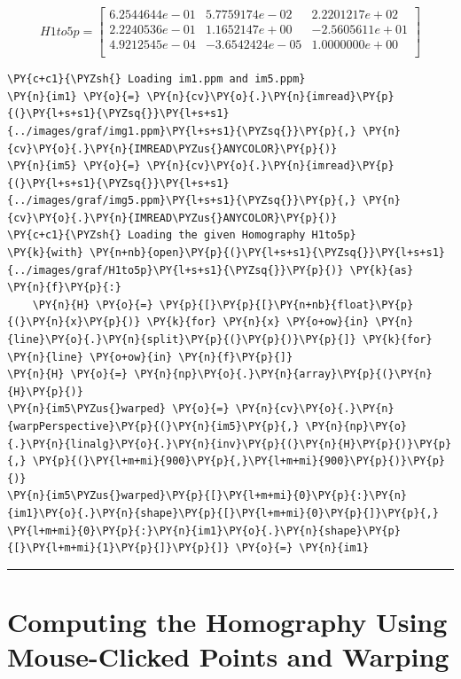 \documentclass[a4paper,11pt]{article}%
\begin{document}
{\scriptsize

\[
H1to5p = 
\begin{bmatrix}
   6.2544644e-01&   5.7759174e-02&   2.2201217e+02\\
2.2240536e-01   &1.1652147e+00  &-2.5605611e+01\\
4.9212545e-04 & -3.6542424e-05 &  1.0000000e+00\\
\end{bmatrix}
\]}
    \begin{tcolorbox}[breakable, size=fbox, boxrule=1pt, pad at break*=1mm,colback=cellbackground, colframe=cellborder]
\begin{Verbatim}[commandchars=\\\{\}]
\PY{c+c1}{\PYZsh{} Loading im1.ppm and im5.ppm}
\PY{n}{im1} \PY{o}{=} \PY{n}{cv}\PY{o}{.}\PY{n}{imread}\PY{p}{(}\PY{l+s+s1}{\PYZsq{}}\PY{l+s+s1}{../images/graf/img1.ppm}\PY{l+s+s1}{\PYZsq{}}\PY{p}{,} \PY{n}{cv}\PY{o}{.}\PY{n}{IMREAD\PYZus{}ANYCOLOR}\PY{p}{)}
\PY{n}{im5} \PY{o}{=} \PY{n}{cv}\PY{o}{.}\PY{n}{imread}\PY{p}{(}\PY{l+s+s1}{\PYZsq{}}\PY{l+s+s1}{../images/graf/img5.ppm}\PY{l+s+s1}{\PYZsq{}}\PY{p}{,} \PY{n}{cv}\PY{o}{.}\PY{n}{IMREAD\PYZus{}ANYCOLOR}\PY{p}{)}
\PY{c+c1}{\PYZsh{} Loading the given Homography H1to5p}
\PY{k}{with} \PY{n+nb}{open}\PY{p}{(}\PY{l+s+s1}{\PYZsq{}}\PY{l+s+s1}{../images/graf/H1to5p}\PY{l+s+s1}{\PYZsq{}}\PY{p}{)} \PY{k}{as} \PY{n}{f}\PY{p}{:}
    \PY{n}{H} \PY{o}{=} \PY{p}{[}\PY{p}{[}\PY{n+nb}{float}\PY{p}{(}\PY{n}{x}\PY{p}{)} \PY{k}{for} \PY{n}{x} \PY{o+ow}{in} \PY{n}{line}\PY{o}{.}\PY{n}{split}\PY{p}{(}\PY{p}{)}\PY{p}{]} \PY{k}{for} \PY{n}{line} \PY{o+ow}{in} \PY{n}{f}\PY{p}{]}
\PY{n}{H} \PY{o}{=} \PY{n}{np}\PY{o}{.}\PY{n}{array}\PY{p}{(}\PY{n}{H}\PY{p}{)}
\PY{n}{im5\PYZus{}warped} \PY{o}{=} \PY{n}{cv}\PY{o}{.}\PY{n}{warpPerspective}\PY{p}{(}\PY{n}{im5}\PY{p}{,} \PY{n}{np}\PY{o}{.}\PY{n}{linalg}\PY{o}{.}\PY{n}{inv}\PY{p}{(}\PY{n}{H}\PY{p}{)}\PY{p}{,} \PY{p}{(}\PY{l+m+mi}{900}\PY{p}{,}\PY{l+m+mi}{900}\PY{p}{)}\PY{p}{)}
\PY{n}{im5\PYZus{}warped}\PY{p}{[}\PY{l+m+mi}{0}\PY{p}{:}\PY{n}{im1}\PY{o}{.}\PY{n}{shape}\PY{p}{[}\PY{l+m+mi}{0}\PY{p}{]}\PY{p}{,} \PY{l+m+mi}{0}\PY{p}{:}\PY{n}{im1}\PY{o}{.}\PY{n}{shape}\PY{p}{[}\PY{l+m+mi}{1}\PY{p}{]}\PY{p}{]} \PY{o}{=} \PY{n}{im1}
\end{Verbatim}
\end{tcolorbox}
\vspace{0.5cm}
\hrule
\section{Computing the Homography Using Mouse-Clicked Points and Warping}
\end{document}
